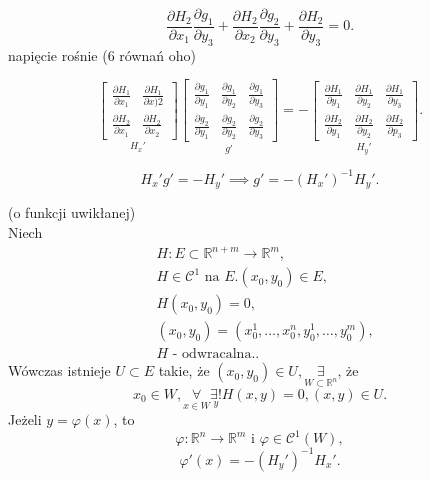 \documentclass[../main.tex]{subfiles}
\begin{document}
\[
\frac{\partial H_2}{\partial x_1} \frac{\partial g_1}{\partial y_3} +\frac{\partial H_2}{\partial x_2} \frac{\partial g_2}{\partial y_3} +\frac{\partial H_2}{\partial y_3} = 0
.\]
napięcie rośnie (6 równań oho)

\[
    \underset{H_x'}{\begin{bmatrix}
\frac{\partial H_1}{\partial x_1} &\frac{\partial H_1}{\partial x)2} \\
\frac{\partial H_2}{\partial x_1} &\frac{\partial H_2}{\partial x_2} \end{bmatrix}}
\underset{g'}{\begin{bmatrix}
\frac{\partial g_1}{\partial y_1} &\frac{\partial g_1}{\partial y_2} &\frac{\partial g_1}{\partial y_3} \\
\frac{\partial g_2}{\partial y_1} &\frac{\partial g_2}{\partial y_2} &\frac{\partial g_2}{\partial y_3} \end{bmatrix}}
= -
\underset{H_y'}{\begin{bmatrix}
\frac{\partial H_1}{\partial y_1} &\frac{\partial H_1}{\partial y_2} &\frac{\partial H_1}{\partial y_3} \\
\frac{\partial H_2}{\partial y_1} &\frac{\partial H_2}{\partial y_2} &\frac{\partial H_2}{\partial p_3} \end{bmatrix}}
.\]

\[
    H_x' g' = -H_y' \implies g' = -(H_x')^{-1}H_y'
.\]

\pagebreak
\begin{tw}
    (o funkcji uwikłanej)\\
    Niech
    \begin{align*}
        &H:E\subset\mathbb{R}^{n+m}\to\mathbb{R}^{m},\\
        &H\in\mathcal{C}^{1} \text{ na } E. (x_0,y_0)\in E, \\
        &H(x_0,y_0)=0, \\
        &(x_0,y_0) = (x_0^1,\ldots,x_0^n,y_0^1,\ldots,y_0^m), \\
        &H \text{ - odwracalna}.
    .\end{align*}
    Wówczas istnieje  $U\subset E$ takie, że $(x_0,y_0)\in U, \underset{W\subset \mathbb{R}^{n}}{\exists} $, że
    \[
        x_0\in W, \underset{x\in W}{\forall} \underset{y}{\exists !} H(x,y) = 0, (x,y) \in U.
    \]
    Jeżeli $y= \varphi(x)$, to
    \[
        \varphi:\mathbb{R}^{n}\to\mathbb{R}^{m} \text{ i } \varphi\in \mathcal{C}^{1}(W),
    \]
    \[
         \varphi'(x) = -(H_y')^{-1}H_x'
     .\]
\end{tw}
\end{document}
